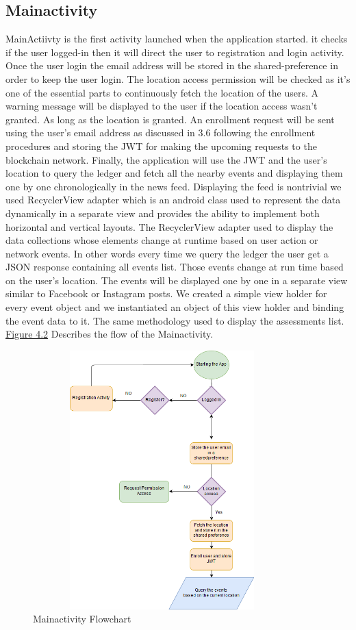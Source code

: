 \subsection{Mainactivity}
MainActiivty is the first activity launched when the application started. it checks if the user logged-in then it will direct the user to registration and login activity. 
Once the user login the email address will be stored in the shared-preference in order to keep the user login. The location access permission will be checked as it's one of the essential parts to continuously fetch the location of the users. A warning message will be displayed to the user if the location access wasn't granted. As long as the location is granted. An enrollment request will be sent using the user's email address as discussed in 3.6 following the enrollment procedures and storing the JWT for making the upcoming requests to the blockchain network.
Finally, the application will use the JWT and the user's location to query the ledger and fetch all the nearby events and displaying them one by one chronologically in the news feed. 
Displaying the feed is nontrivial we used RecyclerView adapter which is an android class used to represent the data dynamically in a separate view and provides the ability to implement both horizontal and vertical layouts. The RecyclerView adapter used to display the data collections whose elements change at runtime based on user action or network events.  In other words every time we query the ledger the user get a JSON response containing all events list. Those events change at run time based on the user's location. The events will be displayed one by one in a separate view similar to Facebook or Instagram posts. 
We created a simple view holder for every event object and we instantiated an object of this view holder and binding the event data to it.    
The same methodology used to display the assessments list.
\hyperref[fig:mainactivityflow]{Figure 4.2} Describes the flow of the Mainactivity. 
 \begin{figure}[H]
\center
\includegraphics[width=10cm,height=10cm]{images/mainactivityflow.png}
\caption{Mainactivity Flowchart}
\label{fig:mainactivityflow}
\end{figure}

